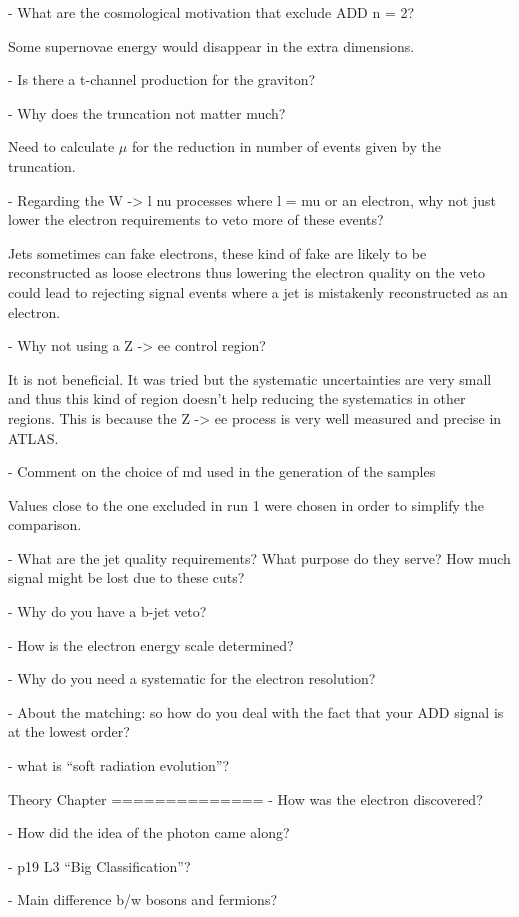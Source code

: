 \documentclass[a4paper,10pt,twoside,notitlepage]{article}
\begin{document}
\begin{description}
  - What are the cosmological motivation that exclude ADD n = 2?

  Some supernovae energy would disappear in the extra dimensions.

  - Is there a t-channel production for the graviton?

  - Why does the truncation not matter much?

  Need to calculate $\mu$ for the reduction in number of events given by the
  truncation.

  - Regarding the W -> l nu processes where l = mu or an electron, why not just
  lower the electron requirements to veto more of these events?

  Jets sometimes can fake electrons, these kind of fake are likely to be
  reconstructed as loose electrons thus lowering the electron quality on the
  veto could lead to rejecting signal events where a jet is mistakenly
  reconstructed as an electron.

  - Why not using a Z -> ee control region?

  It is not beneficial. It was tried but the systematic uncertainties are very
  small and thus this kind of region doesn't help reducing the systematics in
  other regions. This is because the Z -> ee process is very well measured and
  precise in ATLAS.

  - Comment on the choice of md used in the generation of the samples

  Values close to the one excluded in run 1 were chosen in order to simplify the
  comparison.

  - What are the jet quality requirements? What purpose do they serve? How much
  signal might be lost due to these cuts?

  - Why do you have a b-jet veto?

  - How is the electron energy scale determined?

  - Why do you need a systematic for the electron resolution?

  - About the matching: so how do you deal with the fact that your ADD signal is
  at the lowest order?

  - what is “soft radiation evolution”?

  Theory Chapter ============== - How was the electron discovered?

  - How did the idea of the photon came along?

  - p19 L3 “Big Classification”?

  - Main difference b/w bosons and fermions?


\end{description}
\end{document}

